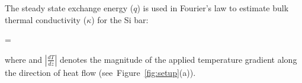 The steady state exchange energy ($q$) is used in Fourier's law to estimate bulk thermal conductivity ($\kappa$)
for the Si  bar:

\be
 \kappa =  
\ee

\noindent where  and
$\left|\frac{dT}{dz}\right|$ denotes the magnitude of the applied 
temperature gradient along the direction of heat flow (see~Figure~\ref{fig:setup}(a)).





























